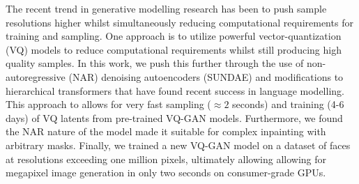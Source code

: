 The recent trend in generative modelling research has been to push sample
resolutions higher whilst simultaneously reducing computational requirements for
training and sampling. One approach is to utilize powerful vector-quantization
(VQ) models to reduce computational requirements whilst still producing high
quality samples. In this work, we push this further through the use of
non-autoregressive (NAR) denoising autoencoders (SUNDAE) and modifications to
hierarchical transformers that have found recent success in language modelling.
This approach to allows for very fast sampling ($\approx 2$ seconds) and
training (4-6 days) of VQ latents from pre-trained VQ-GAN models. Furthermore,
we found the NAR nature of the model made it suitable for complex inpainting
with arbitrary masks. Finally, we trained a new VQ-GAN model on a dataset of
faces at resolutions exceeding one million pixels, ultimately allowing allowing
for megapixel image generation in only two seconds on consumer-grade GPUs.

